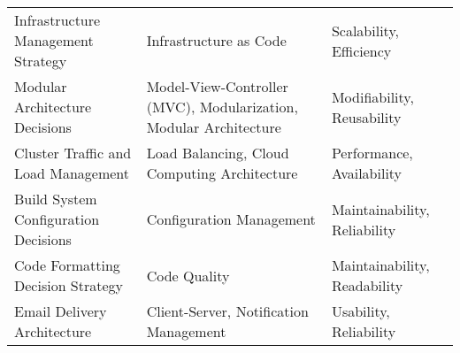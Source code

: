 {\begin{longtable}{p{5cm}p{6cm}p{3cm}}
        Infrastructure Management Strategy & Infrastructure as Code & Scalability, Efficiency \\
        Modular Architecture Decisions & Model-View-Controller (MVC), Modularization, Modular Architecture & Modifiability, Reusability \\
        Cluster Traffic and Load Management & Load Balancing, Cloud Computing Architecture & Performance, Availability \\
        Build System Configuration Decisions & Configuration Management & Maintainability, Reliability \\
        Code Formatting Decision Strategy & Code Quality & Maintainability, Readability \\
        Email Delivery Architecture & Client-Server, Notification Management & Usability, Reliability \\
        \hline
    \end{longtable}
}